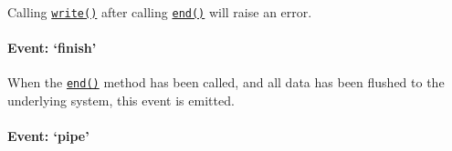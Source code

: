 Calling
\hyperref[streamux5fwritableux5fwriteux5fchunkux5fencodingux5fcallback]{\texttt{write()}}
after calling
\hyperref[streamux5fwritableux5fendux5fchunkux5fencodingux5fcallback]{\texttt{end()}}
will raise an error.

\begin{Shaded}
\begin{Highlighting}[]
 \NormalTok{(}\NormalTok{);}
\NormalTok{(}\NormalTok{);}
\NormalTok{(}\NormalTok{);}
\end{Highlighting}
\end{Shaded}

\paragraph{\texorpdfstring{Event:
`finish'}{Event: finish}}\label{event-finish}

When the
\hyperref[streamux5fwritableux5fendux5fchunkux5fencodingux5fcallback]{\texttt{end()}}
method has been called, and all data has been flushed to the underlying
system, this event is emitted.

\begin{Shaded}
\begin{Highlighting}[]
 \NormalTok{();}
 \NormalTok{(} 
  \NormalTok{(} \NormalTok{);}
\NormalTok{\}}
\NormalTok{(}\NormalTok{);}
\NormalTok{(}\NormalTok{, }\NormalTok{() \{}
  \NormalTok{(}\NormalTok{);}
\NormalTok{\});}
\end{Highlighting}
\end{Shaded}

\paragraph{\texorpdfstring{Event:
`pipe'}{Event: pipe}}\label{event-pipe}

